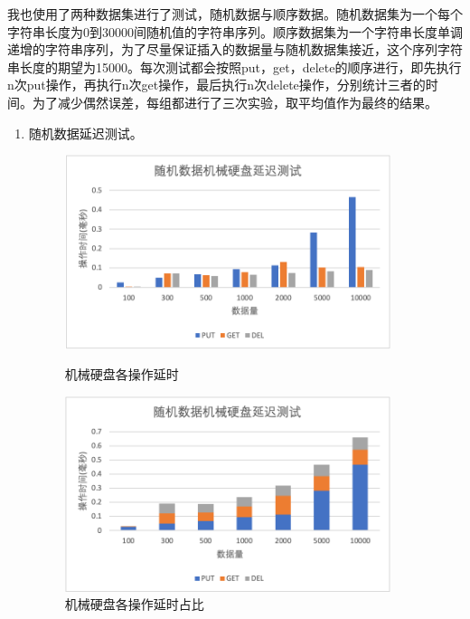 \documentclass[fontset=windows]{article}
\begin{document}
我也使用了两种数据集进行了测试，随机数据与顺序数据。随机数据集为一个每个字符串长度为0到30000间随机值的字符串序列。顺序数据集为一个字符串长度单调递增的字符串序列，为了尽量保证插入的数据量与随机数据集接近，这个序列字符串长度的期望为15000。每次测试都会按照put，get，delete的顺序进行，即先执行n次put操作，再执行n次get操作，最后执行n次delete操作，分别统计三者的时间。为了减少偶然误差，每组都进行了三次实验，取平均值作为最终的结果。
\begin{enumerate}
\item 随机数据延迟测试。
\begin{figure}[H]
   \begin{minipage}[t]{0.5\linewidth}   
     \centering   
     \includegraphics[width=0.9\textwidth]{img/random_latency_three.png}   
     \caption{机械硬盘各操作延时}   
     \label{fig:r_l_t}
   \end{minipage}
   \begin{minipage}[t]{0.5\linewidth} %
     \centering
     \includegraphics[width=0.9\textwidth]{img/random_latency_one.png}
     \caption{机械硬盘各操作延时占比}
     \label{fig:r_l_o}
    \end{minipage} 

\end{figure}
\end{enumerate}
\end{document}
